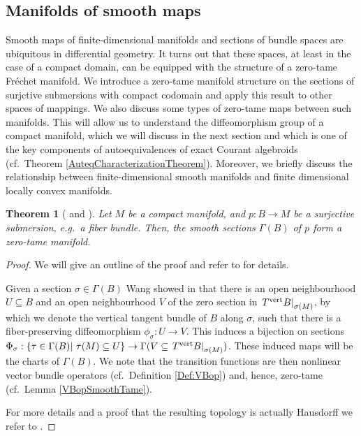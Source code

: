 \documentclass[12pt,a4paper]{article}
\theoremstyle{plain}
\newtheorem{theorem}{Theorem}[subsection]
\theoremstyle{definition}
\newcommand{\tn}{\textnormal}
\begin{document}
\subsection{Manifolds of smooth maps}

Smooth maps of finite-dimensional manifolds and sections of bundle spaces are ubiquitous in differential geometry. It turns out that these spaces, at least in the case of a compact domain, can be equipped with the structure of a zero-tame Fréchet manifold. We introduce a zero-tame manifold structure on the sections of surjctive submersions with compact codomain and apply this result to other spaces of mappings. We also discuss some types of zero-tame maps between such manifolds. This will allow us to understand the diffeomorphism group of a compact manifold, which we will discuss in the next section and which is one of the key components of autoequivalences of exact Courant algebroids (cf.~Theorem \ref{AuteqCharacterizationTheorem}). Moreover, we briefly discuss the relationship between finite-dimensional smooth manifolds and finite dimensional locally convex manifolds.

\begin{theorem}[{\cite[Part II, Theorem 2.3.1]{hamilton} and \cite[Proposition 3.2.4]{RWang}}]
\label{FiberBundleSection}
Let $M$ be a compact manifold, and $p:B\to M$ be a surjective submersion, e.g.~a fiber bundle. Then, the smooth sections $\Gamma(B)$ of $p$ form a zero-tame manifold.
\end{theorem}
\begin{proof}
We will give an outline of the proof and refer to \cite{RWang} for details.

Given a section $\sigma\in \Gamma(B)$ Wang showed in \cite[Lemma 3.2.1]{RWang} that there is an open neighbourhood $U\subseteq B$ and an open neighbourhood $V$ of the zero section in $\left.T^{\tn{vert}}B\right|_{\sigma(M)}$, by which we denote the vertical tangent bundle of $B$ along $\sigma$, such that there is a fiber-preserving diffeomorphism $\phi_\sigma:U\to V$. This induces a bijection on sections $\Phi_{\sigma}:\{\tau\in \Gamma(B)|~\tau(M)\subseteq U\}\to \Gamma(V\subseteq \left.T^{\tn{vert}}B\right|_{\sigma(M)})$. These induced maps will be the charts of $\Gamma(B)$. We note that the transition functions are then nonlinear vector bundle operators (cf.~Definition \ref{Def:VBop}) and, hence, zero-tame (cf.~Lemma \ref{VBopSmoothTame}).

For more details and a proof that the resulting topology is actually Hausdorff we refer to \cite[Proposition 3.2.4]{RWang}. 
\end{proof}
\end{document}
